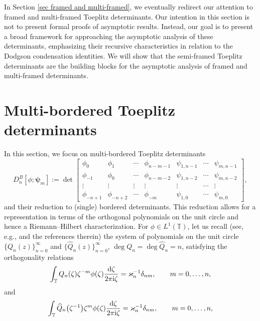 \documentclass[pdftex]{sigma}
\numberwithin{equation}{section}
\newcommand{\T}{{\mathbb T}}
\newcommand{\de}{\delta}
\newcommand{\ze}{\zeta}
\newcommand{\ii}{{\rm i}}
\newcommand{\dd}{{\rm d}}
\begin{document}
	In Section \ref{sec framed and multi-framed}, we eventually redirect our attention to framed and multi-framed Toeplitz determinants. Our intention in this section is not to present formal proofs of asymptotic results. Instead, our goal is to present a broad framework for approaching the asymptotic analysis of these determinants, emphasizing their recursive characteristics in relation to the Dodgson condensation identities. We will show that the semi-framed Toeplitz determinants are the building blocks for the asymptotic analysis of framed and multi-framed determinants.
	
\section{Multi-bordered Toeplitz determinants} \label{sec bordered}
	In this section, we focus on multi-bordered Toeplitz determinants
	\begin{equation}\label{btdmulti}
		D^B_n[\phi;\boldsymbol{\psi}_m] := \det \begin{bmatrix}
			\phi_0& \phi_{1} & \cdots & \phi_{n-m-1} & \psi_{1,n-1} & \cdots & \psi_{m,n-1} \\
			\phi_{-1}& \phi_0 & \cdots & \phi_{n-m-2} & \psi_{1,n-2} & \cdots & \psi_{m,n-2} \\
			\vdots & \vdots & \vdots & \vdots & \vdots & \cdots & \vdots \\
			\phi_{-n+1} & \phi_{-n+2} & \cdots & \phi_{-m} & \psi_{1,0} & \cdots & \psi_{m,0}
		\end{bmatrix},
	\end{equation}
	and their reduction to (single) bordered determinants. This reduction allows for a representation in terms of the orthogonal polynomials on the unit circle and hence a Riemann--Hilbert characterization. For $\phi \in L^1(\T)$, let us recall (see, e.g., \cite{DIK} and the references therein) the system of polynomials on the unit circle $\{Q_n(z)\}^{\infty}_{n=0}$ and $\big\{\widehat{Q}_n(z)\big\}^{\infty}_{n=0}$, $\deg Q_n = \deg \widehat{Q}_n = n$, satisfying the orthogonality relations
	\begin{equation*}
		\int_{\T} Q_n(\ze)\ze^{-m}\phi(\ze)\frac{\dd \ze}{2\pi \ii \ze}=\varkappa^{-1}_n \de_{nm}, \qquad m =0, \dots,n,
	\end{equation*}
	and
	\begin{equation*}
		\int_{\T} \widehat{Q}_n\big(\ze^{-1}\big)\ze^{m}\phi(\ze)\frac{\dd \ze}{2\pi \ii \ze}=\varkappa^{-1}_n \de_{nm}, \qquad m =0, \dots,n,
	\end{equation*}
\end{document}
